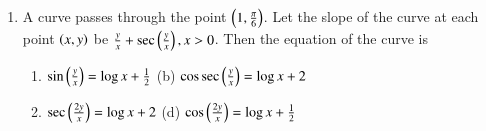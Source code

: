 \documentclass[journal,12pt,twocolumn]{IEEEtran}
\theoremstyle{remark}
\begin{document}
\begin{enumerate}
\item A curve passes through the point $ \left(1,\frac{\pi}{6}\right) $. Let the slope of the curve at each point $ \left(x, y\right) $ be $ \frac{y}{x} + \sec\left(\frac{y}{x}\right), x > 0 $. Then the equation of the curve is 
\begin{enumerate}[label=(\alph*)]
    \item $ \sin\left(\frac{y}{x}\right) = \log x + \frac{1}{2} $ \quad(b) $ \cos\sec\left(\frac{y}{x}\right) = \log x + 2 $
    \item $ \sec\left(\frac{2y}{x}\right) = \log x + 2 $ \quad (d) $ \cos\left(\frac{2y}{x}\right) = \log x + \frac{1}{2} $
\end{enumerate}
\end{enumerate}
\end{document}
